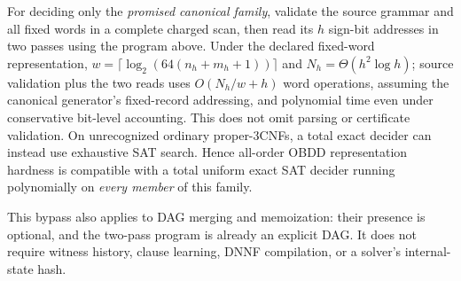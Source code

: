 \documentclass[11pt]{article}
\begin{document}
For deciding only the \emph{promised canonical family}, validate the source grammar and all fixed words in a complete charged scan, then read its $h$ sign-bit addresses in two passes using the program above. Under the declared fixed-word representation, $w=\lceil\log_2(64(n_h+m_h+1))\rceil$ and $N_h=\Theta(h^2\log h)$; source validation plus the two reads uses $O(N_h/w+h)$ word operations, assuming the canonical generator's fixed-record addressing, and polynomial time even under conservative bit-level accounting. This does not omit parsing or certificate validation. On unrecognized ordinary proper-3CNFs, a total exact decider can instead use exhaustive SAT search. Hence all-order OBDD representation hardness is compatible with a total uniform exact SAT decider running polynomially on \emph{every member} of this family.

This bypass also applies to DAG merging and memoization: their presence is optional, and the two-pass program is already an explicit DAG. It does not require witness history, clause learning, DNNF compilation, or a solver's internal-state hash.
\end{document}
